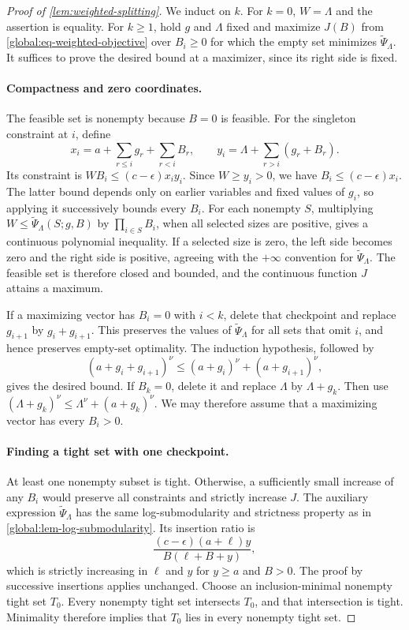 \documentclass[10pt,a4paper]{amsart}
\begin{document}
\begin{proof}[Proof of \cref{lem:weighted-splitting}]
We induct on $k$.
For $k=0$, $W=\Lambda$ and the assertion is equality.
For $k\ge1$, hold $g$ and $\Lambda$ fixed and maximize $J(B)$ from \eqref{global:eq-weighted-objective} over $B_i\ge0$ for which the empty set minimizes $\widetilde\Psi_\Lambda$.
It suffices to prove the desired bound at a maximizer, since its right side is fixed.

\paragraph{Compactness and zero coordinates.}
The feasible set is nonempty because $B=0$ is feasible.
For the singleton constraint at $i$, define
\[
  x_i=a+\sum_{r\le i}g_r+\sum_{r<i}B_r,
  \qquad y_i=\Lambda+\sum_{r>i}(g_r+B_r).
\]
Its constraint is $WB_i\le(c-\epsilon) x_i y_i$.
Since $W\ge y_i>0$, we have $B_i\le(c-\epsilon) x_i$.
The latter bound depends only on earlier variables and fixed values of $g_i$, so applying it successively bounds every $B_i$.
For each nonempty $S$, multiplying $W\le\widetilde\Psi_\Lambda(S;g,B)$ by $\prod_{i\in S}B_i$, when all selected sizes are positive, gives a continuous polynomial inequality.
If a selected size is zero, the left side becomes zero and the right side is positive, agreeing with the $+\infty$ convention for $\widetilde\Psi_\Lambda$.
The feasible set is therefore closed and bounded, and the continuous function $J$ attains a maximum.

If a maximizing vector has $B_i=0$ with $i<k$, delete that checkpoint and replace $g_{i+1}$ by $g_i+g_{i+1}$.
This preserves the values of $\widetilde\Psi_\Lambda$ for all sets that omit $i$, and hence preserves empty-set optimality.
The induction hypothesis, followed by
\[
  (a+g_i+g_{i+1})^\nu
  \le(a+g_i)^\nu+(a+g_{i+1})^\nu,
\]
gives the desired bound.
If $B_k=0$, delete it and replace $\Lambda$ by $\Lambda+g_k$. Then use $(\Lambda+g_k)^\nu\le\Lambda^\nu+(a+g_k)^\nu$.
We may therefore assume that a maximizing vector has every $B_i>0$.

\paragraph{Finding a tight set with one checkpoint.}
At least one nonempty subset is tight.
Otherwise, a sufficiently small increase of any $B_i$ would preserve all constraints and strictly increase $J$.
The auxiliary expression $\widetilde\Psi_\Lambda$ has the same log-submodularity and strictness property as in \cref{global:lem-log-submodularity}. Its insertion ratio is
\[
  \frac{(c-\epsilon)(a+\ell)y}{B(\ell+B+y)},
\]
which is strictly increasing in $\ell$ and $y$ for $y\ge a$ and $B>0$.
The proof by successive insertions applies unchanged.
Choose an inclusion-minimal nonempty tight set $T_0$.
Every nonempty tight set intersects $T_0$, and that intersection is tight.
Minimality therefore implies that $T_0$ lies in every nonempty tight set.


\end{proof}
\end{document}
